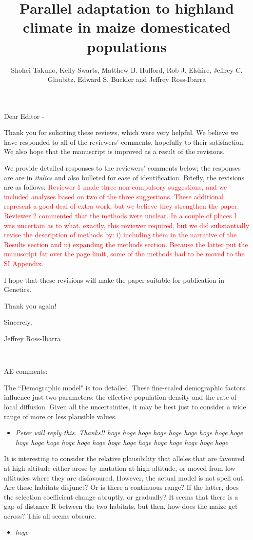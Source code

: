 \documentclass[onecolumn,oneside,letterpaper]{article}
\title{Parallel adaptation to highland climate in maize domesticated populations}
\author{
 Shohei Takuno, Kelly Swarts, Matthew B. Hufford, Rob J. Elshire, Jeffrey C. Glaubitz, Edward S. Buckler and Jeffrey Ross-Ibarra
   }
\newcommand{\st}[1]{\textcolor{red}{ #1}}
\begin{document}
\maketitle
Dear Editor - 

Thank you for soliciting these reviews, which were very helpful.   We believe we have responded to all of the reviewers' comments, hopefully to their satisfaction.  We also hope that the manuscript is improved as a result of the revisions.  

We provide detailed responses to the reviewers' comments below; the responses are are in \textit{italics} and also bulleted for ease of identification.  
Briefly, the revisions are as follows:  
\st{Reviewer 1 made three non-compulsory suggestions, and we included analyses based on two of the three suggestions.  
These additional represent a good deal of extra work, but we believe they strengthen the paper. 
Reviewer 2 commented that the methods were unclear.  
In a couple of places I was uncertain as to what, exactly, this reviewer required, but we did substantially revise the description of methods by: i) including them in the narrative of the Results section and ii) expanding the methods section.   
Because the latter put the manuscript far over the page limit, some of the methods had to be moved to the SI Appendix.}  

I hope that these revisions will make the paper suitable for publication in Genetics. 

Thank you again! 

Sincerely, 

Jeffrey Ross-Ibarra

--------------------------------------------------------------------


AE comments: 

The ``Demographic model" is too detailed.  These fine-scaled demographic factors influence just two parameters: the effective population density and the rate of local diffusion.  Given all the uncertainties, it may be best just to consider a wide range of more or less plausible values. 
\setlength{\parskip}{-5.0pt}
\begin{itemize}
\item \textit{ Peter will reply this.  Thanks!!  hoge hoge hoge hoge hoge hoge hoge hoge hoge hoge hoge hoge hoge hoge hoge hoge hoge hoge hoge hoge hoge hoge hoge }
\end{itemize}
\setlength{\parskip}{10.0pt}

It is interesting to consider the relative plausibility that alleles that are favoured at high altitude either arose by mutation at high altitude, or moved from low altitudes where they are disfavoured.  However, the actual model is not spell out.  Are these habitats disjunct?  Or is there a continuous range? If the latter, does the selection coefficient change abruptly, or gradually?  It seems that there is a gap of distance R between the two habitats, but then, how does the maize get across?  This all seems obscure. 
\setlength{\parskip}{-5.0pt}
\begin{itemize}
\item \textit{ hoge }
\end{itemize}
\setlength{\parskip}{10.0pt}
\end{document}
